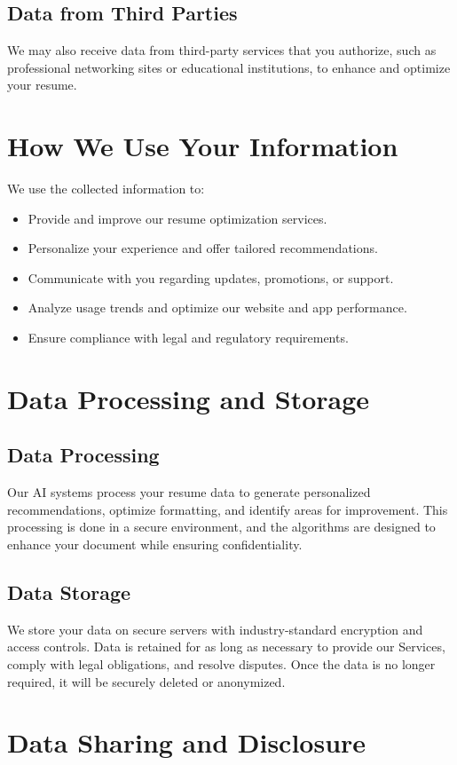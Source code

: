 \documentclass[12pt]{article}
\begin{document}
\subsection{Data from Third Parties}
We may also receive data from third-party services that you authorize, such as professional networking sites or educational institutions, to enhance and optimize your resume.

\section{How We Use Your Information}
We use the collected information to:
\begin{itemize}
    \item Provide and improve our resume optimization services.
    \item Personalize your experience and offer tailored recommendations.
    \item Communicate with you regarding updates, promotions, or support.
    \item Analyze usage trends and optimize our website and app performance.
    \item Ensure compliance with legal and regulatory requirements.
\end{itemize}

\section{Data Processing and Storage}
\subsection{Data Processing}
Our AI systems process your resume data to generate personalized recommendations, optimize formatting, and identify areas for improvement. This processing is done in a secure environment, and the algorithms are designed to enhance your document while ensuring confidentiality.

\subsection{Data Storage}
We store your data on secure servers with industry-standard encryption and access controls. Data is retained for as long as necessary to provide our Services, comply with legal obligations, and resolve disputes. Once the data is no longer required, it will be securely deleted or anonymized.

\section{Data Sharing and Disclosure}
\end{document}
